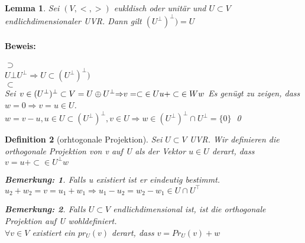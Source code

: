 \documentclass{report}
\theoremstyle{customrem}
\newtheorem*{bemerkung}{Bemerkung\textnormal:}
\theoremstyle{customdef}
\newtheorem{definition}{Definition}[chapter]
\newtheorem{lemma}[definition]{Lemma}
\renewenvironment{proof}{\paragraph{Beweis: }}{\qed}
\theoremstyle{customenv}
\begin{document}
\begin{lemma}
  Sei \((V, <, >)\) eukldisch oder unit\"ar und \(U \subset V\)
  endlichdimensionaler UVR. Dann gilt \((U^\bot)^\bot) = U\)
  \begin{proof}
    \(\supset\)\\
    \(U \bot U^\bot \Rightarrow U \subset(U^\bot)^\bot)\)\\
    \(\subset\)\\
    Sei \(v \in (U^\bot)^\bot
    \subset{V = U \oplus U^\bot}{\Rightarrow} v
    = \subset{\in U}{u} + \subset{\in W}{w}\\
    \)
    Es gen\"ugt zu zeigen, dass \(w = 0 \Rightarrow v = u \in U\).\\
    \(w = v - u, u \in U \subset (U^\bot)^\bot, v \in U
    \Rightarrow w \in (U^\bot)^\bot \cap U^\bot = \{0\}\)
  \end{proof}
\end{lemma}

\begin{definition}[orhtogonale Projektion]
  Sei \(U \subset V\) UVR. Wir definieren die orthogonale Projektion von
  v auf U als der Vektor \(u \in U\) derart,
  dass \(v = u + \subset{\in U^\bot}{w}\)
  \begin{bemerkung}
    Falls u existiert ist er eindeutig bestimmt.\\
    \(u_2 + w_2 = v = u_1 + w_1
    \Rightarrow u_1 - u_2 = w_2 - w_1 \in U \cap U^\top\)
  \end{bemerkung}
  \begin{bemerkung}
    Falls \(U \subset V\) endlichdimensional ist, ist die orthogonale
    Projektion auf U wohldefiniert.\\
    \(\forall v \in V\) existiert ein \(pr_U(v)\) derart, dass
    \(v = Pr_U(v) + w\)
  \end{bemerkung}
\end{definition}
\end{document}
